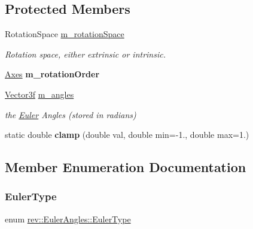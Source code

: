 \subsection*{Protected Members}
\begin{DoxyCompactItemize}
\item 
Rotation\+Space \mbox{\hyperlink{classrev_1_1_euler_angles_abeac6934af203889a200b47b2c16050e}{m\+\_\+rotation\+Space}}
\begin{DoxyCompactList}\small\item\em Rotation space, either extrinsic or intrinsic. \end{DoxyCompactList}\item 
\mbox{\label{classrev_1_1_euler_angles_a936f949f4114b4fd9cc817dbb296fc90}} 
\mbox{\hyperlink{classrev_1_1_vector}{Axes}} {\bfseries m\+\_\+rotation\+Order}
\item 
\mbox{\label{classrev_1_1_euler_angles_a4b7125aa180901eb43a3e5e239d02018}} 
\mbox{\hyperlink{classrev_1_1_vector}{Vector3f}} \mbox{\hyperlink{classrev_1_1_euler_angles_a4b7125aa180901eb43a3e5e239d02018}{m\+\_\+angles}}
\begin{DoxyCompactList}\small\item\em the \mbox{\hyperlink{class_euler}{Euler}} Angles (stored in radians) \end{DoxyCompactList}\item 
\mbox{\label{classrev_1_1_euler_angles_a99218eb9e43720366d234281696433fa}} 
static double {\bfseries clamp} (double val, double min=-\/1., double max=1.)
\end{DoxyCompactItemize}


\subsection{Member Enumeration Documentation}
\mbox{\label{classrev_1_1_euler_angles_a27302602f4b1e12892749e201df3d52d}} 
\subsubsection{\texorpdfstring{EulerType}{EulerType}}
{\footnotesize\ttfamily enum \mbox{\hyperlink{classrev_1_1_euler_angles_a27302602f4b1e12892749e201df3d52d}{rev\+::\+Euler\+Angles\+::\+Euler\+Type}}}



